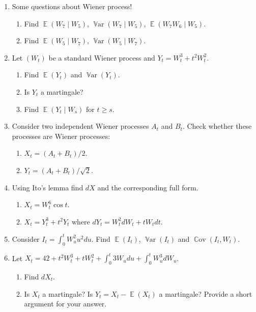 \documentclass[12pt]{article}
\DeclareMathOperator{\Cov}{\mathbb{C}ov}
\DeclareMathOperator{\Var}{\mathbb{V}ar}
\DeclareMathOperator{\E}{\mathbb{E}}
\begin{document}
\begin{enumerate}

  
  \item Some questions about Wiener process!
  \begin{enumerate}
    \item Find $\E(W_7 \mid W_5)$, $\Var(W_7\mid W_5)$, $\E(W_7 W_6 \mid W_5)$.
    \item Find $\E(W_5 \mid W_7)$, $\Var(W_5\mid W_7)$.
  \end{enumerate}
  
  \item Let $(W_t)$ be a standard Wiener process and $Y_t = W_t^3 + t^2 W_t^2$.
  \begin{enumerate}
    \item Find $\E(Y_t)$ and $\Var(Y_t)$.
    \item Is $Y_t$ a martingale?
    \item Find $\E(Y_{t} \mid W_s)$ for $t \geq s$. 
  \end{enumerate}


  \item Consider two independent Wiener processes $A_t$ and $B_t$.
  Check whether these processes are Wiener processes:
  \begin{enumerate}
    \item $X_t = (A_t + B_t) / 2$.
    \item $Y_t = (A_t + B_t) / \sqrt{2}$.
  \end{enumerate}

  \item Using Ito's lemma find $dX$ and the corresponding full form.
  \begin{enumerate}
    \item $X_t = W_t^6 \cos t$.
    \item $X_t = Y_t^3 + t^2 Y_t$ where $dY_t = W_t^2 dW_t + tW_t dt$.
  \end{enumerate}

  \item Consider $I_t = \int_0^t W_u^2 u^2 du$. 
  Find $\E(I_t)$, $\Var(I_t)$ and $\Cov(I_t, W_t)$.

  \item Let $X_t = 42 + t^2W_t^3 + tW_t^2 + \int_0^t 3W_u du + \int_0^t W_u^3 dW_u$.
  \begin{enumerate}
    \item Find $dX_t$.
    \item Is $X_t$ a martingale? Is $Y_t = X_t - \E(X_t)$ a martingale? Provide a short argument for your answer. 
  \end{enumerate}
  
  

\end{enumerate}
\end{document}

